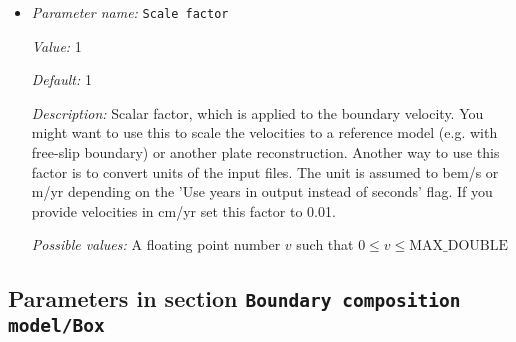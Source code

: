 \begin{itemize}
{\it Possible values:} An integer $n$ such that $-2147483648\leq n \leq 2147483647$
\item {\it Parameter name:} {\tt Scale factor}
\label{parameters:Boundary composition model/Ascii data model/Scale factor}


{\it Value:} 1


{\it Default:} 1


{\it Description:} Scalar factor, which is applied to the boundary velocity. You might want to use this to scale the velocities to a reference model (e.g. with free-slip boundary) or another plate reconstruction. Another way to use this factor is to convert units of the input files. The unit is assumed to bem/s or m/yr depending on the 'Use years in output instead of seconds' flag. If you provide velocities in cm/yr set this factor to 0.01.


{\it Possible values:} A floating point number $v$ such that $0 \leq v \leq \text{MAX\_DOUBLE}$
\end{itemize}

\subsection{Parameters in section \tt Boundary composition model/Box}
\label{parameters:Boundary_20composition_20model/Box}

